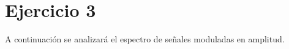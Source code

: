 \documentclass[../../labo_tp5_main.tex]{subfiles}
\begin{document}
\section{Ejercicio 3}

A continuaci\'on se analizar\'a el espectro de se\~nales moduladas en amplitud.
\end{document}
